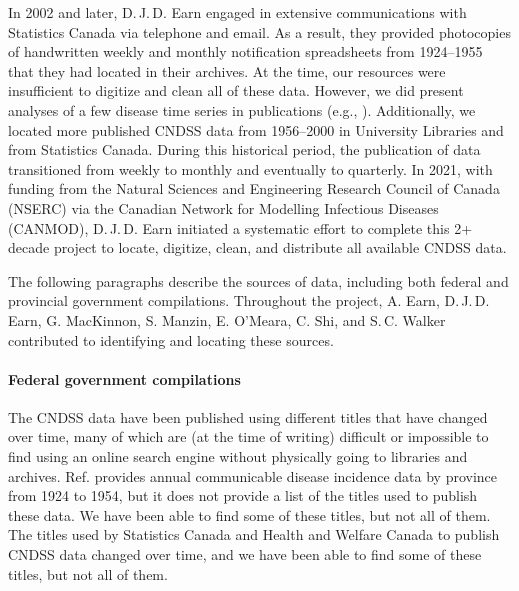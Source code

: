 \documentclass[12pt]{article}
\begin{document}
In 2002 and later, D.\,J.\,D. Earn engaged in extensive communications with Statistics Canada via telephone and email. As a result, they provided photocopies of handwritten weekly and monthly notification spreadsheets from 1924--1955 that they had located in their archives. At the time, our resources were insufficient to digitize and clean all of these data. However, we did present analyses of a few disease time series in publications (e.g., \cite{BaucEarn03,Hook+11}). Additionally, we located more published CNDSS data from 1956--2000 in University Libraries and from Statistics Canada. During this historical period, the publication of data transitioned from weekly to monthly and eventually to quarterly. In 2021, with funding from the Natural Sciences and Engineering Research Council of Canada (NSERC) via the Canadian Network for Modelling Infectious Diseases (CANMOD), D.\,J.\,D. Earn initiated a systematic effort to complete this 2+ decade project to locate, digitize, clean, and distribute all available CNDSS data.

The following paragraphs describe the sources of data, including both federal and provincial government compilations. Throughout the project, A. Earn, D.\,J.\,D. Earn, G. MacKinnon, S. Manzin, E. O'Meara, C. Shi, and S.\,C. Walker contributed to identifying and locating these sources.

\paragraph*{Federal government compilations}

The CNDSS data have been published using different titles that have changed over time, many of which are (at the time of writing) difficult or impossible to find using an online search engine without physically going to libraries and archives. Ref. \cite{summaryNotifiable1954} provides annual communicable disease incidence data by province from 1924 to 1954,  but it does not provide a list of the titles used to publish these data. We have been able to find some of these titles, but not all of them. The titles used by Statistics Canada and Health and Welfare Canada to publish CNDSS data changed over time, and we have been able to find some of these titles, but not all of them. 
\end{document}

